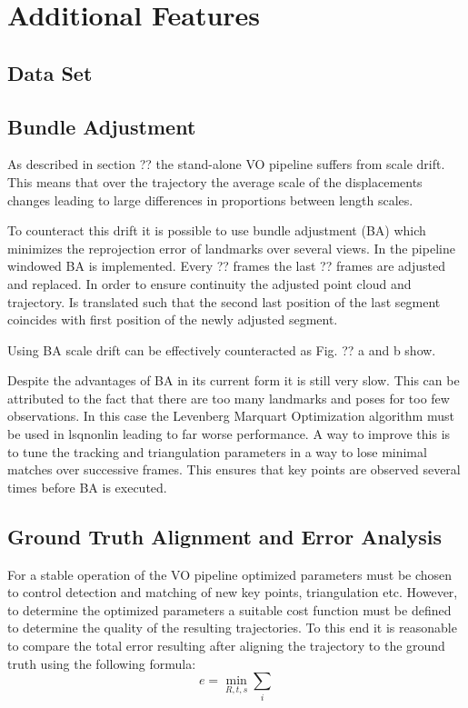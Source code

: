 \chapter{Additional Features}
\section{Data Set}

\section{Bundle Adjustment}
As described in section ?? the stand-alone VO pipeline suffers from scale drift. This means that over the trajectory the average scale of the displacements changes leading to large differences in proportions between length scales. \par
To counteract this drift it is possible to use bundle adjustment (BA) which minimizes the reprojection error of landmarks over several views. In the pipeline windowed BA is implemented. Every ?? frames the last ?? frames are adjusted and replaced. In order to ensure continuity the adjusted point cloud and trajectory. Is translated such that the second last position of the last segment coincides with first position of the newly adjusted segment. \par
Using BA scale drift can be effectively counteracted as Fig. ?? a and b show.


Despite the advantages of BA in its current form it is still very slow. This can be attributed to the fact that there are too many landmarks and poses for too few observations. In this case the Levenberg Marquart Optimization algorithm must be used in lsqnonlin leading to far worse performance. A way to improve this is to tune the tracking and triangulation parameters in a way to lose minimal matches over successive frames. This ensures that key points are observed several times before BA is executed. 

\section{Ground Truth Alignment and Error Analysis}
For a stable operation of the VO pipeline optimized parameters must be chosen to control detection and matching of new key points, triangulation etc. However, to determine the optimized parameters a suitable cost function must be defined to determine the quality of the resulting trajectories. To this end it is reasonable to compare the total error resulting after aligning the trajectory to the ground truth using the following formula:
$$e = \underset{R,t,s}{\min} \sum_i$$
